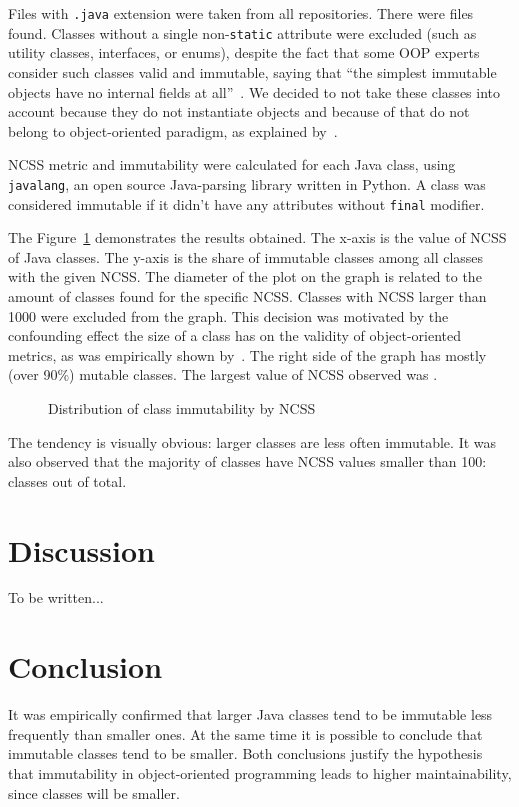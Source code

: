 \documentclass[sigconf]{acmart}
\begin{document}
Files with \texttt{.java} extension were taken from all repositories.
There were \thetotaljavafiles{} files found. Classes without a single
non-\texttt{static} attribute were excluded (such as utility classes,
interfaces, or enums), despite the fact that some OOP
experts consider such classes valid and immutable, saying that
``the simplest immutable objects have no internal fields at all''~\citep{lea2000}.
We decided to not take these classes into account because they do not instantiate objects
and because of that do not belong to object-oriented paradigm,
as explained by~\cite{west2004,bugayenko2017}.

NCSS metric and immutability were calculated for each Java class,
using \texttt{javalang}, an open source Java-parsing library written in Python.
A class was considered immutable if it didn't have any
attributes without \texttt{final} modifier.

The Figure~\ref{fig:1} demonstrates the results obtained. The x-axis is
the value of NCSS of Java classes. The y-axis is the share of immutable classes among
all classes with the given NCSS. The diameter of the plot on the graph
is related to the amount of classes found for the specific NCSS. Classes
with NCSS larger than 1000 were excluded from the graph. This decision was
motivated by the confounding effect the size of a class has
on the validity of object-oriented metrics, as was empirically shown by~\citet{el2001}.
The right side of the graph has mostly (over 90\%) mutable classes. The largest
value of NCSS observed was \thelargestncss{}.

\begin{figure}[h]
  
  \caption{Distribution of class immutability by NCSS}
  \label{fig:1}
\end{figure}

The tendency is visually obvious: larger classes are less often immutable. It
was also observed that the majority of classes have NCSS values smaller than 100:
\thebelowhundred{} classes out of \thetotaljavafiles{} total.

\section{Discussion}
\label{sec:discussion}

To be written...

\section{Conclusion}
\label{sec:conclusion}

It was empirically confirmed that larger Java classes tend to be immutable
less frequently than smaller ones. At the same time it is possible to conclude
that immutable classes tend to be smaller. Both conclusions justify
the hypothesis that immutability in object-oriented programming leads
to higher maintainability, since classes will be smaller.




\end{document}
